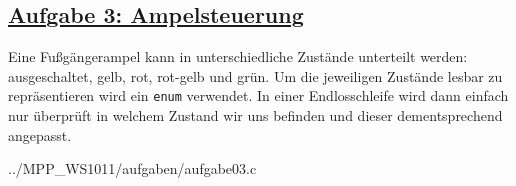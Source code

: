 \subsection*{
\href{http://cst.mi.fu-berlin.de/intern/19606-P-MPP/Aufgaben/040103.html}
{Aufgabe 3: Ampelsteuerung}}
Eine Fußgängerampel kann in unterschiedliche Zustände unterteilt werden: ausgeschaltet, gelb, rot, rot-gelb und grün.
Um die jeweiligen Zustände lesbar zu repräsentieren wird ein \texttt{enum} verwendet.
In einer Endlosschleife wird dann einfach nur überprüft in welchem Zustand wir uns befinden und dieser dementsprechend angepasst.

{../MPP_WS1011/aufgaben/aufgabe03.c}

